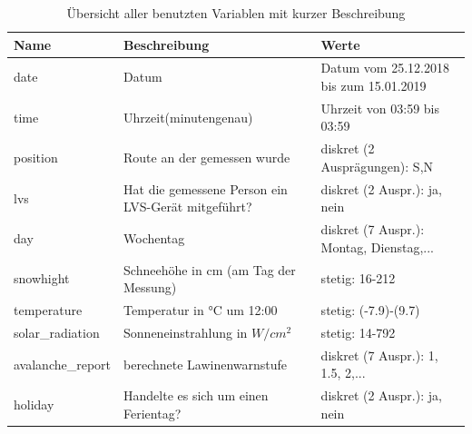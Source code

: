\documentclass[12pt]{scrreprt}
\begin{document}
\begin{table}

\centering

\caption{Übersicht aller benutzten Variablen mit kurzer Beschreibung}

\begin{adjustbox}{max width=\textwidth}

\begin{tabular}{l|l|l}

\textbf{Name} & \textbf{Beschreibung} & \textbf{Werte} \\

\hline

\hline

date & Datum & Datum vom 25.12.2018 bis zum 15.01.2019 \\

\hline

time & Uhrzeit(minutengenau) & Uhrzeit von 03:59 bis 03:59 \\

\hline

position & Route an der gemessen wurde & diskret (2 Ausprägungen): S,N \\

\hline

lvs & Hat die gemessene Person ein LVS-Gerät mitgeführt? & diskret (2 Auspr.): ja, nein \\

\hline

day & Wochentag & diskret (7 Auspr.): Montag, Dienstag,... \\

\hline

snowhight & Schneehöhe in cm (am Tag der Messung) & stetig: 16-212 \\

\hline

temperature & Temperatur in °C um 12:00 & stetig: (-7.9)-(9.7) \\

\hline

solar\_radiation & Sonneneinstrahlung in $W/cm^2$ & stetig: 14-792 \\

\hline

avalanche\_report & berechnete Lawinenwarnstufe & diskret (7 Auspr.): 1, 1.5, 2,... \\

\hline

holiday & Handelte es sich um einen Ferientag? & diskret (2 Auspr.): ja, nein \\


\end{tabular}
\end{adjustbox}
\end{table}
\end{document}
